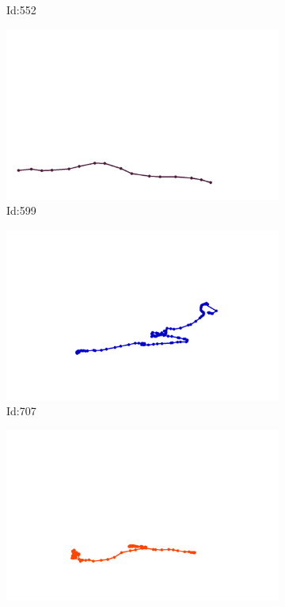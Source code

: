 \documentclass[12pt,twoside]{report}
\begin{document}
\begin{figure}
\begin{subfigure}[b]{0.20\textwidth}
\caption{Id:552}
\end{subfigure}
\begin{subfigure}[b]{0.20\textwidth}
\centering
\includegraphics[width=\textwidth]{../trajectories/599.png}
\caption{Id:599}
\end{subfigure}
\begin{subfigure}[b]{0.20\textwidth}
\centering
\includegraphics[width=\textwidth]{../trajectories/707.png}
\caption{Id:707}
\end{subfigure}
\begin{subfigure}[b]{0.20\textwidth}
\centering
\includegraphics[width=\textwidth]{../trajectories/709.png}

\end{subfigure}
\end{figure}
\end{document}
